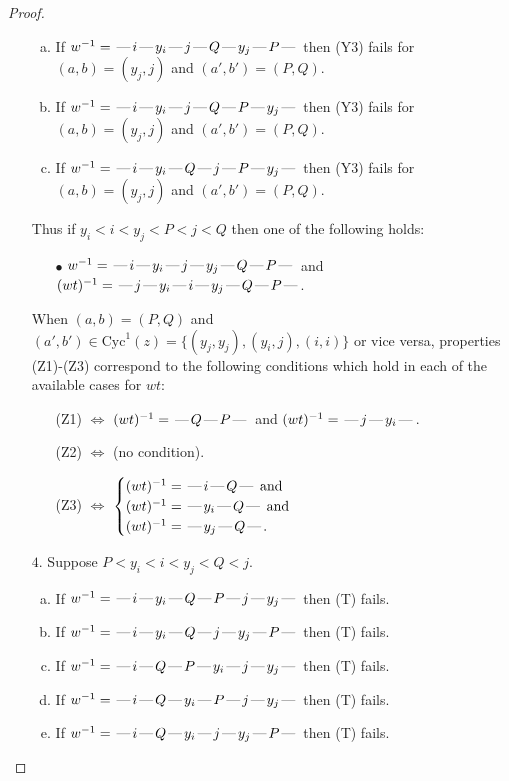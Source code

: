 \documentclass[10pt]{article}
\theoremstyle{definition}
\theoremstyle{definition}
\def\dash{\text{\hspace{0.5mm}---\hspace{0.5mm}}}
\def\Cyc{\mathrm{Cyc}}
\begin{document}
\begin{proof}
\begin{enumerate}
\begin{enumerate}[(a)]
\item If $w^{-1} = \dash i\dash y_i\dash j\dash Q\dash y_j\dash P\dash $ then (Y3) fails for $(a,b)=(y_j,j)$ and $(a',b')=(P,Q)$.
\item If $w^{-1} = \dash i\dash y_i\dash j\dash Q\dash P\dash y_j\dash $ then (Y3) fails for $(a,b)=(y_j,j)$ and $(a',b')=(P,Q)$.
\item If $w^{-1} = \dash i\dash y_i\dash Q\dash j\dash P\dash y_j\dash $ then (Y3) fails for $(a,b)=(y_j,j)$ and $(a',b')=(P,Q)$.
\end{enumerate}
Thus if $y_i < i < y_j < P < j < Q$ then one of the following holds:
\begin{enumerate}
\item[$\bullet$] $w^{-1} = \dash i\dash y_i\dash j\dash y_j\dash Q\dash P\dash $ and $(wt)^{-1} = \dash j\dash y_i\dash i\dash y_j\dash Q\dash P\dash $.
\end{enumerate}
When $(a,b)= (P,Q)$ and $(a',b')\in \Cyc^1(z)=\{(y_j,y_j),(y_i,j),(i,i)\}$ or vice versa,
properties (Z1)-(Z3) correspond to the following conditions which
hold in each of the available cases for $wt$:
\begin{enumerate}
\item[](Z1) $\Leftrightarrow$ $(wt)^{-1} = \dash Q \dash P \dash$  and $(wt)^{-1} = \dash j \dash y_i \dash$.
\item[](Z2) $\Leftrightarrow$ (no condition).
\item[](Z3) $\Leftrightarrow$ $\begin{cases}\text{$(wt)^{-1} = \dash i \dash Q \dash$}\text{ and }\\
\text{$(wt)^{-1} = \dash y_i \dash Q \dash$}\text{ and }\\
\text{$(wt)^{-1} = \dash y_j \dash Q \dash$}.\end{cases}$
\end{enumerate}
\item[$4$.] Suppose $P < y_i < i < y_j < Q < j$.
\begin{enumerate}[(a)]
\item If $w^{-1} = \dash i\dash y_i\dash Q\dash P\dash j\dash y_j\dash $ then (T) fails.
\item If $w^{-1} = \dash i\dash y_i\dash Q\dash j\dash y_j\dash P\dash $ then (T) fails.
\item If $w^{-1} = \dash i\dash Q\dash P\dash y_i\dash j\dash y_j\dash $ then (T) fails.
\item If $w^{-1} = \dash i\dash Q\dash y_i\dash P\dash j\dash y_j\dash $ then (T) fails.
\item If $w^{-1} = \dash i\dash Q\dash y_i\dash j\dash y_j\dash P\dash $ then (T) fails.

\end{enumerate}
\end{enumerate}
\end{proof}
\end{document}
